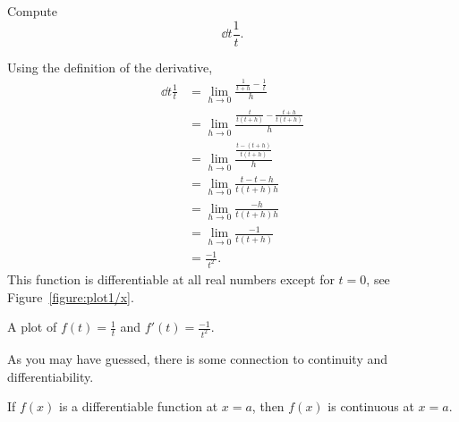 \begin{example}
Compute
\[
\dd t \frac{1}{t}.
\]
\end{example}

\begin{solution}
Using the definition of the derivative,
\begin{align*}
\dd{t}\frac{1}{t}&=\lim_{ h\to0}\frac{\frac{1}{t+ h} - \frac{1}{t}}{h} \\
&=\lim_{h\to0}\frac{\frac{t}{t(t+ h)} - \frac{t+ h}{t(t+ h)}}{h} \\
&=\lim_{h\to0}\frac{\frac{t-(t+ h)}{t(t+ h)}}{h} \\
&=\lim_{h\to0}\frac{t-t- h}{t(t+ h) h} \\
&=\lim_{h\to0}\frac{- h}{t(t+ h) h} \\
&=\lim_{h\to0}\frac{-1}{t(t+ h)}\\
&=\frac{-1}{t^2}.
\end{align*}
This function is differentiable at all real numbers except for $t=0$, see Figure~\ref{figure:plot1/x}.
\end{solution}
\begin{marginfigure}
\caption{A plot of $f(t) = \frac{1}{t}$ and $f'(t) = \frac{-1}{t^2}$.}
\label{figure:plot1/x}
\end{marginfigure}


As you may have guessed, there is some connection to continuity and
differentiability. 



\begin{mainTheorem}\label{theorem:diff-cont}
If $f(x)$ is a differentiable function at $x = a$, then $f(x)$ is
continuous at $x=a$.
\end{mainTheorem}

